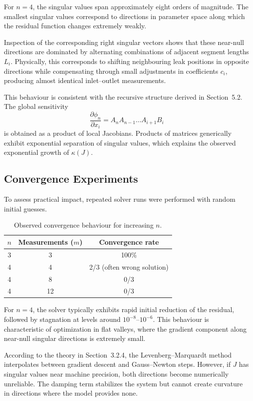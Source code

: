 For $n=4$, the singular values span approximately eight orders of magnitude. The smallest singular values correspond to directions in parameter space along which the residual function changes extremely weakly.

Inspection of the corresponding right singular vectors shows that these near-null directions are dominated by alternating combinations of adjacent segment lengths $L_i$. Physically, this corresponds to shifting neighbouring leak positions in opposite directions while compensating through small adjustments in coefficients $c_i$, producing almost identical inlet–outlet measurements.

This behaviour is consistent with the recursive structure derived in Section~5.2. The global sensitivity
\[
\frac{\partial \phi_n}{\partial x_i}
=
A_n A_{n-1} \dots A_{i+1} B_i
\]
is obtained as a product of local Jacobians. Products of matrices generically exhibit exponential separation of singular values, which explains the observed exponential growth of $\kappa(J)$.

\subsection*{Convergence Experiments}

To assess practical impact, repeated solver runs were performed with random initial guesses.

\begin{table}[h]
\centering
\begin{tabular}{c c c}
\hline
$n$ & Measurements ($m$) & Convergence rate \\
\hline
3 & 3  & 100\% \\
4 & 4  & 2/3 (often wrong solution) \\
4 & 8  & 0/3 \\
4 & 12 & 0/3 \\
\hline
\end{tabular}
\caption{Observed convergence behaviour for increasing $n$.}
\end{table}

For $n=4$, the solver typically exhibits rapid initial reduction of the residual, followed by stagnation at levels around $10^{-8}$--$10^{-6}$. This behaviour is characteristic of optimization in flat valleys, where the gradient component along near-null singular directions is extremely small.

According to the theory in Section~3.2.4, the Levenberg--Marquardt method interpolates between gradient descent and Gauss--Newton steps. However, if $J$ has singular values near machine precision, both directions become numerically unreliable. The damping term stabilizes the system but cannot create curvature in directions where the model provides none.

